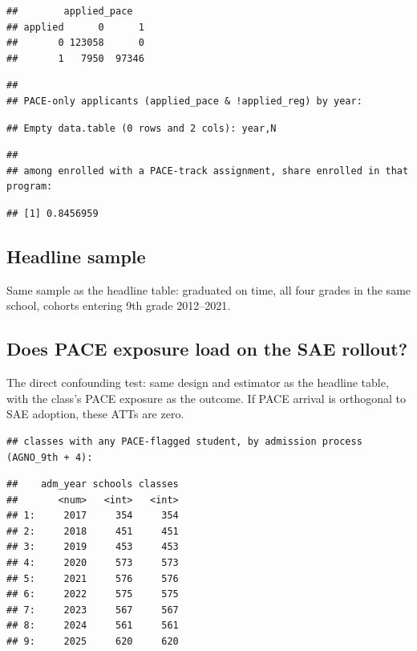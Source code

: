 \documentclass[
]{article}
\begin{document}
\begin{verbatim}
##        applied_pace
## applied      0      1
##       0 123058      0
##       1   7950  97346
\end{verbatim}

\begin{verbatim}
## 
## PACE-only applicants (applied_pace & !applied_reg) by year:
\end{verbatim}

\begin{verbatim}
## Empty data.table (0 rows and 2 cols): year,N
\end{verbatim}

\begin{verbatim}
## 
## among enrolled with a PACE-track assignment, share enrolled in that program:
\end{verbatim}

\begin{verbatim}
## [1] 0.8456959
\end{verbatim}

\hypertarget{headline-sample}{%
\subsection{Headline sample}\label{headline-sample}}

Same sample as the headline table: graduated on time, all four grades in
the same school, cohorts entering 9th grade 2012--2021.

\hypertarget{does-pace-exposure-load-on-the-sae-rollout}{%
\subsection{Does PACE exposure load on the SAE
rollout?}\label{does-pace-exposure-load-on-the-sae-rollout}}

The direct confounding test: same design and estimator as the headline
table, with the class's PACE exposure as the outcome. If PACE arrival is
orthogonal to SAE adoption, these ATTs are zero.

\begin{verbatim}
## classes with any PACE-flagged student, by admission process (AGNO_9th + 4):
\end{verbatim}

\begin{verbatim}
##    adm_year schools classes
##       <num>   <int>   <int>
## 1:     2017     354     354
## 2:     2018     451     451
## 3:     2019     453     453
## 4:     2020     573     573
## 5:     2021     576     576
## 6:     2022     575     575
## 7:     2023     567     567
## 8:     2024     561     561
## 9:     2025     620     620
\end{verbatim}
\end{document}
